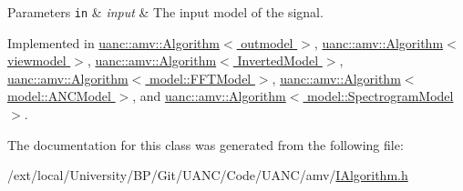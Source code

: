 \begin{DoxyParams}[1]{Parameters}
\mbox{\tt in}  & {\em input} & The input model of the signal. \\
\hline
\end{DoxyParams}


Implemented in \hyperlink{classuanc_1_1amv_1_1_algorithm_a0af524c2f170204c5c60b2561f286570}{uanc\+::amv\+::\+Algorithm$<$ outmodel $>$}, \hyperlink{classuanc_1_1amv_1_1_algorithm_a0af524c2f170204c5c60b2561f286570}{uanc\+::amv\+::\+Algorithm$<$ viewmodel $>$}, \hyperlink{classuanc_1_1amv_1_1_algorithm_a0af524c2f170204c5c60b2561f286570}{uanc\+::amv\+::\+Algorithm$<$ Inverted\+Model $>$}, \hyperlink{classuanc_1_1amv_1_1_algorithm_a0af524c2f170204c5c60b2561f286570}{uanc\+::amv\+::\+Algorithm$<$ model\+::\+F\+F\+T\+Model $>$}, \hyperlink{classuanc_1_1amv_1_1_algorithm_a0af524c2f170204c5c60b2561f286570}{uanc\+::amv\+::\+Algorithm$<$ model\+::\+A\+N\+C\+Model $>$}, and \hyperlink{classuanc_1_1amv_1_1_algorithm_a0af524c2f170204c5c60b2561f286570}{uanc\+::amv\+::\+Algorithm$<$ model\+::\+Spectrogram\+Model $>$}.



The documentation for this class was generated from the following file\+:\begin{DoxyCompactItemize}
\item 
/ext/local/\+University/\+B\+P/\+Git/\+U\+A\+N\+C/\+Code/\+U\+A\+N\+C/amv/\hyperlink{_i_algorithm_8h}{I\+Algorithm.\+h}\end{DoxyCompactItemize}
